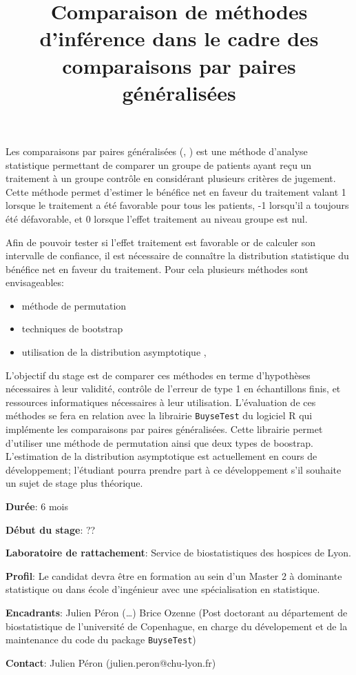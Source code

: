 \documentclass{article}
\date{}
\title{Comparaison de méthodes d'inférence dans le cadre des comparaisons par paires généralisées}
\begin{document}
\author{}
\maketitle{}

Les comparaisons par paires généralisées (\citep{buyse2010generalized},
\citep{peron2018extension}) est une méthode d'analyse statistique
permettant de comparer un groupe de patients ayant reçu un traitement
à un groupe contrôle en considérant plusieurs critères de
jugement. Cette méthode permet d'estimer le bénéfice net en faveur du
traitement valant 1 lorsque le traitement a été favorable pour tous
les patients, -1 lorsqu'il a toujours été défavorable, et 0 lorsque
l'effet traitement au niveau groupe est nul. 

\bigskip

Afin de pouvoir tester si l'effet traitement est favorable or de
calculer son intervalle de confiance, il est nécessaire de connaître la
distribution statistique du bénéfice net en faveur du traitement. Pour
cela plusieurs méthodes sont envisageables:
\begin{itemize}
\item méthode de permutation \citep{buyse2010generalized}
\item techniques de bootstrap \citep{dong2016generalized}
\item utilisation de la distribution asymptotique \citep{luo2015alternative}, \citep{bebu2015large}
\end{itemize}

L'objectif du stage est de comparer ces méthodes en terme d'hypothèses
nécessaires à leur validité, contrôle de l'erreur de type 1 en
échantillons finis, et ressources informatiques nécessaires à leur
utilisation. L'évaluation de ces méthodes se fera en relation avec la
librairie \texttt{BuyseTest} du logiciel R qui implémente les comparaisons par
paires généralisées. Cette librairie permet d'utiliser une méthode de
permutation ainsi que deux types de boostrap. L'estimation de la
distribution asymptotique est actuellement en cours de développement;
l'étudiant pourra prendre part à ce développement s'il souhaite un
sujet de stage plus théorique.

\bigskip

\textbf{Durée}: 6 mois

\textbf{Début du stage}: ??

\textbf{Laboratoire de rattachement}: Service de biostatistiques des hospices de Lyon.

\textbf{Profil}: Le candidat devra être en formation au sein d’un Master 2 à
dominante statistique ou dans école d’ingénieur avec une spécialisation en statistique.

\textbf{Encadrants}: Julien Péron (\ldots{})  Brice Ozenne (Post doctorant au
département de biostatistique de l'université de Copenhague, en charge
du dévelopement et de la maintenance du code du package \texttt{BuyseTest})

\textbf{Contact}: Julien Péron (julien.peron@chu-lyon.fr) 

\bigskip



\end{document}
